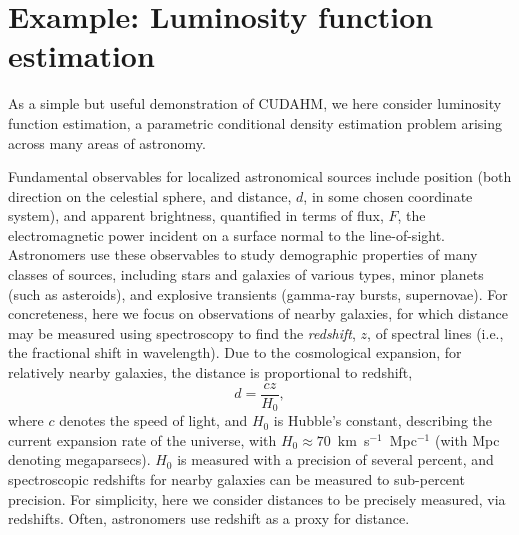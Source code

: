 \section{Example: Luminosity function estimation}
\label{sec:lum_func}

As a simple but useful demonstration of CUDAHM, we here consider luminosity function estimation, a parametric conditional density estimation problem arising across many areas of astronomy.



Fundamental observables for localized astronomical sources include position (both direction on the celestial sphere, and distance, $d$, in some chosen coordinate system), and apparent brightness, quantified in terms of flux, $F$, the electromagnetic power incident on a surface normal to the line-of-sight.
Astronomers use these observables to study demographic properties of many classes of sources, including stars and galaxies of various types, minor planets (such as asteroids), and explosive transients (gamma-ray bursts, supernovae).
For concreteness, here we focus on observations of nearby galaxies, for which distance may be measured using spectroscopy to find the \emph{redshift}, $z$, of spectral lines (i.e., the fractional shift in wavelength).
Due to the cosmological expansion, for relatively nearby galaxies, the distance is proportional to redshift,
\[
d = \frac{cz}{H_0},
\label{eq:d-z}
\]
where $c$ denotes the speed of light, and $H_0$ is Hubble's constant, describing the current expansion rate of the universe, with $H_0 \approx 70$~km~s$^{-1}$~Mpc$^{-1}$ (with Mpc denoting megaparsecs).
$H_0$ is measured with a precision of several percent, and spectroscopic redshifts for nearby galaxies can be measured to sub-percent precision.
For simplicity, here we consider distances to be precisely measured, via redshifts.
Often, astronomers use redshift as a proxy for distance.


